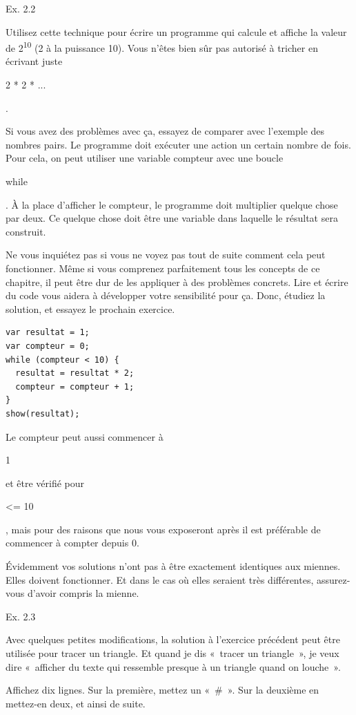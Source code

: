 \documentclass{FramateX}
\renewcommand{\texttt}[1]{\begin{sffamily}{#1}\end{sffamily}}
\begin{document}
\begin{center}\end{center}

Ex. 2.2

Utilisez cette technique pour écrire un programme qui calcule et affiche
la valeur de 2\textsuperscript{10} (2 à la puissance 10). Vous n'êtes
bien sûr pas autorisé à tricher en écrivant juste \texttt{2 * 2 * ...}.

Si vous avez des problèmes avec ça, essayez de comparer avec l'exemple
des nombres pairs. Le programme doit exécuter une action un certain
nombre de fois. Pour cela, on peut utiliser une variable compteur avec
une boucle \texttt{while}. À la place d'afficher le compteur, le
programme doit multiplier quelque chose par deux. Ce quelque chose doit
être une variable dans laquelle le résultat sera construit.

Ne vous inquiétez pas si vous ne voyez pas tout de suite comment cela
peut fonctionner. Même si vous comprenez parfaitement tous les concepts
de ce chapitre, il peut être dur de les appliquer à des problèmes
concrets. Lire et écrire du code vous aidera à développer votre
sensibilité pour ça. Donc, étudiez la solution, et essayez le prochain
exercice.

\begin{lstlisting}
var resultat = 1;
var compteur = 0;
while (compteur < 10) {
  resultat = resultat * 2;
  compteur = compteur + 1;
}
show(resultat);
\end{lstlisting}
Le compteur peut aussi commencer à \texttt{1} et être vérifié pour
\texttt{\textless{}= 10}, mais pour des raisons que nous vous exposeront
après il est préférable de commencer à compter depuis 0.

Évidemment vos solutions n'ont pas à être exactement identiques aux
miennes. Elles doivent fonctionner. Et dans le cas où elles seraient
très différentes, assurez-vous d'avoir compris la mienne.

\begin{center}\end{center}

Ex. 2.3

Avec quelques petites modifications, la solution à l'exercice précédent
peut être utilisée pour tracer un triangle. Et quand je dis «~tracer un
triangle~», je veux dire «~afficher du texte qui ressemble presque à un
triangle quand on louche~».

Affichez dix lignes. Sur la première, mettez un «~\#~». Sur la deuxième
en mettez-en deux, et ainsi de suite.
\end{document}

